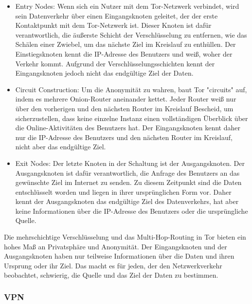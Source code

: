 \begin{itemize}

\item Entry Nodes: Wenn sich ein Nutzer mit dem Tor-Netzwerk verbindet, wird sein Datenverkehr über einen Eingangsknoten geleitet, der der erste Kontaktpunkt mit dem Tor-Netzwerk ist. Dieser Knoten ist dafür verantwortlich, die äußerste Schicht der Verschlüsselung zu entfernen, wie das Schälen einer Zwiebel, um das nächste Ziel im Kreislauf zu enthüllen. Der Einstiegsknoten kennt die IP-Adresse des Benutzers und weiß, woher der Verkehr kommt. Aufgrund der Verschlüsselungsschichten kennt der Eingangsknoten jedoch nicht das endgültige Ziel der Daten.

\item Circuit Construction: Um die Anonymität zu wahren, baut Tor "circuits" auf, indem es mehrere Onion-Router aneinander kettet. Jeder Router weiß nur über den vorherigen und den nächsten Router im Kreislauf Bescheid, um sicherzustellen, dass keine einzelne Instanz einen vollständigen Überblick über die Online-Aktivitäten des Benutzers hat. Der Eingangsknoten kennt daher nur die IP-Adresse des Benutzers und den nächsten Router im Kreislauf, nicht aber das endgültige Ziel.

\item Exit Nodes: Der letzte Knoten in der Schaltung ist der Ausgangsknoten. Der Ausgangsknoten ist dafür verantwortlich, die Anfrage des Benutzers an das gewünschte Ziel im Internet zu senden. Zu diesem Zeitpunkt sind die Daten entschlüsselt worden und liegen in ihrer ursprünglichen Form vor. Daher kennt der Ausgangsknoten das endgültige Ziel des Datenverkehrs, hat aber keine Informationen über die IP-Adresse des Benutzers oder die ursprüngliche Quelle.

\end{itemize}

Die mehrschichtige Verschlüsselung und das Multi-Hop-Routing in Tor bieten ein hohes Maß an Privatsphäre und Anonymität. Der Eingangsknoten und der Ausgangsknoten haben nur teilweise Informationen über die Daten und ihren Ursprung oder ihr Ziel. Das macht es für jeden, der den Netzwerkverkehr beobachtet, schwierig, die Quelle und das Ziel der Daten zu bestimmen\footnotemark{}\footnotemark{}.

\subsubsection{VPN}

